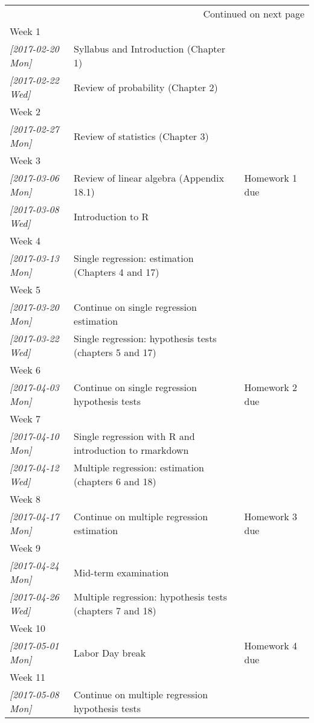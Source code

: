 \documentclass[a4paper,11pt]{article}
\begin{document}
{\begin{longtable}{p{2.8cm}p{9cm}p{3cm}}
\hline
\endhead
\hline\multicolumn{3}{r}{Continued on next page} \\
\endfoot
\endlastfoot
\hline
Week 1 &  & \\
\textit{[2017-02-20 Mon]} & Syllabus and Introduction (Chapter 1) & \\
\textit{[2017-02-22 Wed]} & Review of probability (Chapter 2) & \\
\hline
Week 2 &  & \\
\textit{[2017-02-27 Mon]} & Review of statistics (Chapter 3) & \\
\hline
Week 3 &  & \\
\textit{[2017-03-06 Mon]} & Review of linear algebra (Appendix 18.1) & Homework 1 due\\
\textit{[2017-03-08 Wed]} & Introduction to R & \\
\hline
Week 4 &  & \\
\textit{[2017-03-13 Mon]} & Single regression: estimation (Chapters 4 and 17) & \\
\hline
Week 5 &  & \\
\textit{[2017-03-20 Mon]} & Continue on single regression estimation & \\
\textit{[2017-03-22 Wed]} & Single regression: hypothesis tests (chapters 5 and 17) & \\
\hline
Week 6 &  & \\
\textit{[2017-04-03 Mon]} & Continue on single regression hypothesis tests & Homework 2 due\\
\hline
Week 7 &  & \\
\textit{[2017-04-10 Mon]} & Single regression with R and introduction to rmarkdown & \\
\textit{[2017-04-12 Wed]} & Multiple regression: estimation (chapters 6 and 18) & \\
\hline
Week 8 &  & \\
\textit{[2017-04-17 Mon]} & Continue on multiple regression estimation & Homework 3 due\\
\hline
Week 9 &  & \\
\textit{[2017-04-24 Mon]} & Mid-term examination & \\
\textit{[2017-04-26 Wed]} & Multiple regression: hypothesis tests (chapters 7 and 18) & \\
\hline
Week 10 &  & \\
\textit{[2017-05-01 Mon]} & Labor Day break & Homework 4 due\\
\hline
Week 11 &  & \\
\textit{[2017-05-08 Mon]} & Continue on multiple regression hypothesis tests & \\

\end{longtable}}
\end{document}
